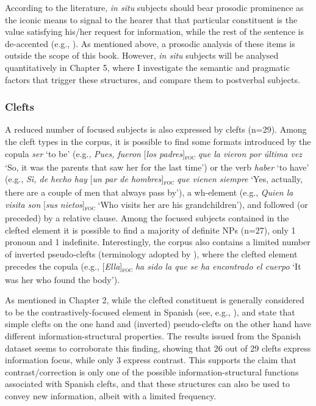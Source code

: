 According to the literature, \textit{in situ} subjects should bear prosodic prominence as the iconic means to signal to the hearer that that particular constituent is the value satisfying his/her request for information, while the rest of the sentence is de-accented (e.g., \cite{fery2001focus}). As mentioned above, a prosodic analysis of these items is outside the scope of this book. However, \textit{in situ} subjects will be analysed quantitatively in Chapter 5, where I investigate the semantic and pragmatic factors that trigger these structures, and compare them to postverbal subjects.

\subsubsection{Clefts}

A reduced number of focused subjects is also expressed by clefts (n=29). Among the cleft types in the corpus, it is possible to find some formats introduced by the copula \textit{ser} `to be' (e.g., \textit{Pues, fueron} [\textit{los padres}]\textsubscript{\textsc{foc}} \normalsize \textit{que la vieron por última vez} `So, it was the parents that saw her for the last time') or the verb \textit{haber} `to have' (e.g., \textit{Sì, de hecho hay} [\textit{un par de hombres}]\textsubscript{\textsc{foc}} \normalsize \textit{que vienen siempre} `Yes, actually, there are a couple of men that always pass by'), a wh-element (e.g., \textit{Quien la visita son} [\textit{sus nietos}]\textsubscript{\textsc{foc}} \normalsize `Who visits her are his grandchildren'), and followed (or preceded) by a relative clause.
Among the focused subjects contained in the clefted element it is possible to find a majority of definite NPs (n=27), only 1 pronoun and 1 indefinite. Interestingly, the corpus  also contains a limited number of inverted pseudo-clefts (terminology adopted by \cite{feldhausen2015oraciones}), where the clefted element precedes the copula (e.g., [\textit{Ella}]\textsubscript{\textsc{foc}} \normalsize \textit{ha sido la que se ha encontrado el cuerpo} `It was her who found the body').

As mentioned in Chapter 2, while the clefted constituent is generally considered to be the contrastively-focused element in Spanish (see, e.g., \cite{zubizarreta1999word, van2005exploring}), \textcite{cabrera1999funciones} and \textcite{feldhausen2015oraciones} state that simple clefts on the one hand and (inverted) pseudo-clefts on the other hand have different information-structural properties. The results issued from the Spanish dataset seems to corroborate this finding, showing that 26 out of 29 clefts express information focus, while only 3 express contrast. This supports the claim that contrast/correction is only one of the possible information-structural functions associated with Spanish clefts, and that these structures can also be used to convey new information, albeit with a limited frequency.
 
